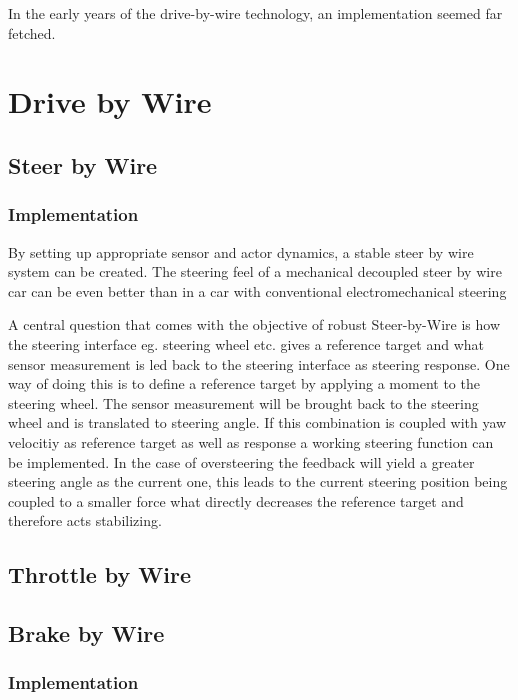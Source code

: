 \documentclass[conference]{IEEEtran}
\begin{document}
In the early years of the drive-by-wire technology, an implementation seemed far fetched.

\section{Drive by Wire}

\subsection{Steer by Wire}

\subsubsection{Implementation}
By setting up appropriate sensor and actor dynamics, a stable steer by wire system can be created.
The steering feel of a mechanical decoupled steer by wire car can be even better than in a car with conventional electromechanical steering 

A central question that comes with the objective of robust Steer-by-Wire is how the steering interface eg.
steering wheel etc. gives a reference target and what sensor measurement is led back to the steering 
interface as steering response. One way of doing this is to define a reference target by applying 
a moment to the steering wheel. The sensor measurement will be brought back to the steering wheel
and is translated to steering angle. If this combination is coupled with yaw velocitiy as reference 
target as well as response a working steering function can be implemented.
In the case of oversteering the feedback will yield a greater steering angle as the current one,
this leads to the current steering position being coupled to a smaller force what directly
decreases the reference target and therefore acts stabilizing.

\subsection{Throttle by Wire}

\subsection{Brake by Wire}
\subsubsection{Implementation}
\end{document}
